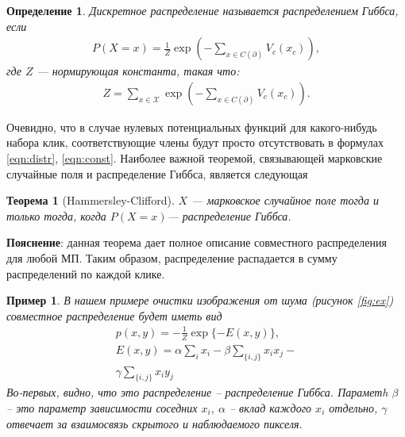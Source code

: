 \documentclass[12pt]{article}
\newtheorem{theorem}{Теорема}
\newtheorem{dfn}{Определение}
\newtheorem{example}{Пример}
\begin{document}
\begin{dfn}
Дискретное распределение называется распределением Гиббса, если
\begin{gather}
P(X=x) = \frac1Z \exp \left( - \sum\limits_{x\in C(\partial)} V_c(x_c) \right), 
\label{eqn:distr}
\end{gather}
где $Z$ --- нормирующая константа, такая что:
\begin{gather}
Z = \sum\limits_{x\in \mathcal{X}} \exp \left( - \sum\limits_{x\in C(\partial)} V_c(x_c)  \right).
\label{eqn:const}
\end{gather}
\end{dfn}
Очевидно, что в случае нулевых потенциальных функций для какого-нибудь набора клик, соответствующие члены будут просто отсутствовать в формулах \eqref{eqn:distr}, \eqref{eqn:const}.
Наиболее важной теоремой, связывающей марковские случайные
поля и распределение Гиббса, является следующая
\begin{theorem}[Hammersley-Clifford]
$X$ --- марковское случайное поле тогда и только тогда, когда $P(X = x)$--- распределение Гиббса.
\end{theorem}

\textbf{Пояснение}: данная теорема дает полное описание совместного распределения для любой МП. Таким образом, распределение распадается в сумму распределений по каждой клике.

\begin{example}
В нашем примере очистки изображения от шума (рисунок \ref{fig:ex}) совместное распределение будет иметь вид
\begin{gather*}
p(x, y) = -\frac{1}{Z} \exp\{ -E(x, y)\}, \\ 
E(x, y) = \alpha \sum\limits_i x_i - \beta \sum\limits_{ \{i, j \} } x_i x_j -   \\ \gamma \sum\limits_{ \{i, j \} } x_i y_j
\end{gather*}
Во-первых, видно, что это распределение -- распределение Гиббса.
Параметh $\beta$ -- это параметр зависимости соседних $x_i$, $\alpha$ -- вклад каждого $x_i$ отдельно, $\gamma$ отвечает за взаимосвязь скрытого и наблюдаемого пикселя.
\end{example}

\newpage
\end{document}
